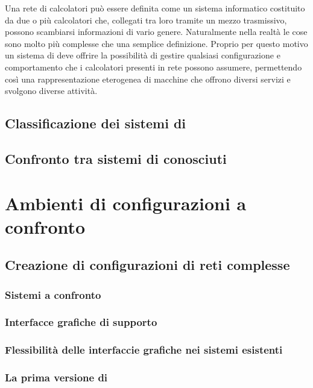Una rete di calcolatori può essere definita come un sistema informatico costituito da due o più calcolatori che, collegati tra loro tramite un mezzo trasmissivo, possono scambiarsi informazioni di vario genere. Naturalmente nella realtà le cose sono molto più complesse che una semplice definizione. Proprio per questo motivo un sistema di \emulazione{} deve offrire la possibilità di gestire qualsiasi configurazione e comportamento che i calcolatori presenti in rete possono assumere, permettendo così una rappresentazione eterogenea di macchine che offrono diversi servizi e svolgono diverse attività.

\subsection{Classificazione dei sistemi di \emulazione{}}

\subsection{Confronto tra sistemi di \emulazione{} conosciuti}


\section{Ambienti di configurazioni a confronto}

\subsection{Creazione di configurazioni di reti complesse}

\subsubsection{Sistemi a confronto}

\subsubsection{Interfacce grafiche di supporto}

\subsubsection{Flessibilità delle interfaccie grafiche nei sistemi esistenti}

\subsubsection{La prima versione di \visualnetkit{}}


